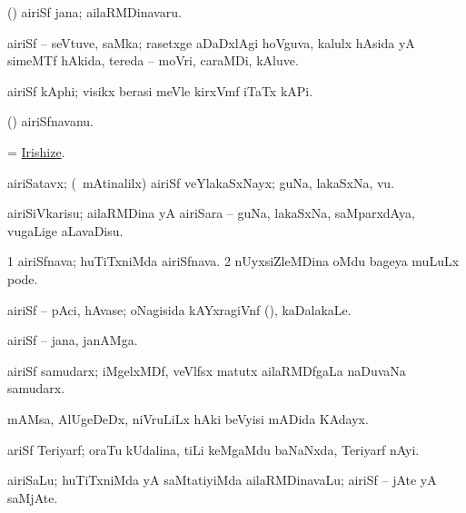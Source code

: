 \noindent 
\gl{\pagu}
\bmng
{} (\bava) airiSf jana; ailaRMDinavaru. 
\emng
\eentry

\bentry
{}
\gl{\nA}
\bmng
airiSf -- seVtuve, saMka; rasetxge aDaDxlAgi hoVguva, kalulx hAsida yA simeMTf hAkida, tereda -- moVri, caraMDi, kAluve. 
\emng
\eentry

\bentry
{}
\gl{\nA}
\bmng
airiSf kAphi; visikx berasi meVle kirxVmf iTaTx kAPi. 
\emng
\eentry

\bentry
{}
\gl{\nA}
\bmng
(\AmA) airiSfnavanu. 
\emng
\eentry

\bentry
{}
\gl{\sakirx}
\bmng
=  \hyperlink{Irishize}{Irishize}. 
\emng
\eentry

\bentry
{}
\gl{\nA}
\bmng
airiSatavx; (\kanmu\ mAtinalilx) airiSf veYlakaSxNayx; guNa, lakaSxNa, \mo vu. 
\emng
\eentry

\bentry
{}
\gl{\sakirx}
\bmng
airiSiVkarisu; ailaRMDina yA airiSara -- guNa, lakaSxNa, saMparxdAya, \mo vugaLige aLavaDisu. 
\emng
\eentry

\bentry
{}
\gl{\nA}
\bmng
\bnum
\num{1} airiSfnava; huTiTxniMda airiSfnava. 
\num{2} nUyxsiZleMDina oMdu bageya muLuLx pode. 
\enum
\emng
\eentry

\bentry
{}
\gl{\nA}
\bmng
airiSf -- pAci, hAvase; oNagisida kAYxragiVnf (), kaDalakaLe. 
\emng
\eentry

\bentry
{}
\gl{\nA}
\bmng
airiSf -- jana, janAMga. 
\emng
\eentry

\bentry
{}
\gl{\nA}
\bmng
airiSf samudarx; iMgelxMDf, veVlfsx matutx ailaRMDfgaLa naDuvaNa samudarx. 
\emng
\eentry

\bentry
{}
\gl{\nA}
\bmng
mAMsa, AlUgeDeDx, niVruLiLx hAki beVyisi mADida KAdayx. 
\emng
\eentry

\bentry
{}
\gl{\nA}
\bmng
ariSf Teriyarf; oraTu kUdalina, tiLi keMgaMdu baNaNxda, Teriyarf nAyi. 
\emng
\eentry

\bentry
{}
\gl{\nA}
\bmng
airiSaLu; huTiTxniMda yA saMtatiyiMda ailaRMDinavaLu; airiSf -- jAte yA saMjAte. 
\emng
\eentry

